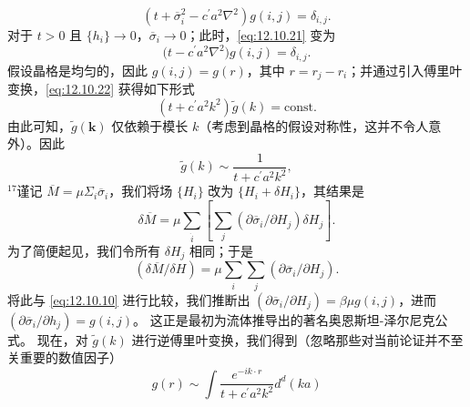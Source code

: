 \begin{equation}\tag{12.11.21}\label{eq:12.11.21}
\left( t + \overline { { \sigma } } _ { i } ^{2} - c ^{\prime} a ^{2} \nabla ^{2} \right) g ( i , j ) = \delta _ { i , j } .
\end{equation}
对于 \(t > 0\) 且 \(\{h_i\} \to 0\)，\(\overline{\sigma}_i \to 0\)；此时，\autoref{eq:12.10.21} 变为
\begin{equation}\tag{12.11.22}\label{eq:12.11.22}
\Big ( t - c ^{\prime} a ^{2} \nabla ^{2} \Big ) g ( i , j ) = \delta _ { i , j } .
\end{equation}
假设晶格是均匀的，因此 \(g(i,j)=g(r)\)，其中 \(r=r_j-r_i\)；并通过引入傅里叶变换，\autoref{eq:12.10.22} 获得如下形式
\begin{equation}\tag{12.11.23}\label{eq:12.11.23}
\left( t + c ^{\prime} a ^{2} k ^{2} \right) \tilde { g } ( k ) = \mathrm { c o n s t } .
\end{equation}
由此可知，\(\tilde{g}(\boldsymbol{k})\) 仅依赖于模长 \(k\)（考虑到晶格的假设对称性，这并不令人意外）。因此
\begin{equation}\tag{12.11.24}\label{eq:12.11.24}
\tilde { g } ( k ) \sim \frac { 1 } { t + c ^{\prime} a ^{2} k ^{2} } ,
\end{equation}
\(^{17}\)谨记 \(\overline{M}=\mu\Sigma_{i}\overline{\sigma}_{i}\)，我们将场 \(\{H_{i}\}\) 改为 \(\{H_{i}+\delta H_{i}\}\)，其结果是
\begin{equation}\tag{12.11.25}\label{eq:12.11.25}
\delta \overline { { { M } } } = \mu \sum _ { \dot { i } } \left[ \sum _ { j } ( \partial \overline { { { \sigma } } } _ { i } / \partial H _ { j } ) \delta H _ { j } \right] .
\end{equation}
为了简便起见，我们令所有 \(\delta H_{j}\) 相同；于是
\begin{equation}\tag{12.11.26}\label{eq:12.11.26}
( \delta \overline { { { M } } } / \delta H ) = \mu \sum _ { i } \sum _ { j } ( \partial \overline { { { \sigma } } } _ { i } / \partial H _ { j } ) .
\end{equation}
将此与 \autoref{eq:12.10.10} 进行比较，我们推断出 \((\partial\overline{\sigma}_i/\partial H_j)=\beta\mu g(i,j)\)，进而 \((\partial\overline{\sigma}_i/\partial h_j)=g(i,j)\)。
这正是最初为流体推导出的著名奥恩斯坦-泽尔尼克公式。
现在，对 \(\tilde{g}(k)\) 进行逆傅里叶变换，我们得到（忽略那些对当前论证并不至关重要的数值因子）
\begin{equation}\tag{12.11.27}\label{eq:12.11.27}
g ( r ) \sim \int \frac { e ^{- i k \cdot r} } { t + c ^{\prime} a ^{2} k ^{2} } d ^{d} ( k a )
\end{equation}

